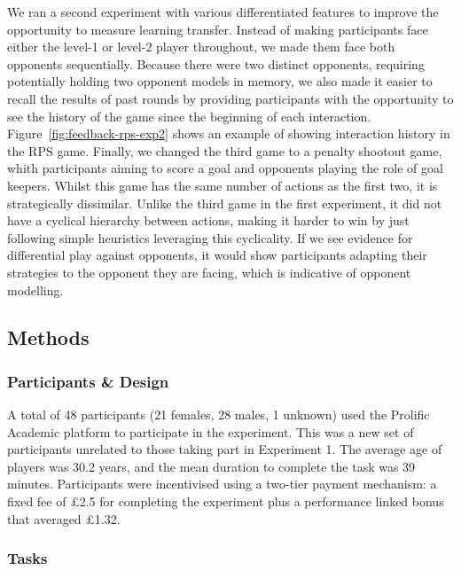 \documentclass[man,floatsintext]{apa6}
\begin{document}
We ran a second experiment with various differentiated features to improve the opportunity to measure learning transfer. Instead of making participants face either the level-1 or level-2 player throughout, we made them face both opponents sequentially. Because there were two distinct opponents, requiring potentially holding two opponent models in memory, we also made it easier to recall the results of past rounds by providing participants with the opportunity to see the history of the game since the beginning of each interaction. Figure~\ref{fig:feedback-rps-exp2} shows an example of showing interaction history in the RPS game. Finally, we changed the third game to a penalty shootout game, whith participants aiming to score a goal and opponents playing the role of goal keepers. Whilst this game has the same number of actions as the first two, it is strategically dissimilar. Unlike the third game in the first experiment, it did not have a cyclical hierarchy between actions, making it harder to win by just following simple heuristics leveraging this cyclicality. If we see evidence for differential play against opponents, it would show participants adapting their strategies to the opponent they are facing, which is indicative of opponent modelling.

\hypertarget{methods-1}{%
\subsection{Methods}\label{methods-1}}

\hypertarget{participants-design}{%
\subsubsection{Participants \& Design}\label{participants-design}}

A total of 48 participants (21 females, 28 males, 1 unknown) used the Prolific Academic platform to participate in the experiment. This was a new set of participants unrelated to those taking part in Experiment 1. The average age of players was 30.2 years, and the mean duration to complete the task was 39 minutes. Participants were incentivised using a two-tier payment mechanism: a fixed fee of £2.5 for completing the experiment plus a performance linked bonus that averaged £1.32.

\hypertarget{tasks-1}{%
\subsubsection{Tasks}\label{tasks-1}}
\end{document}
